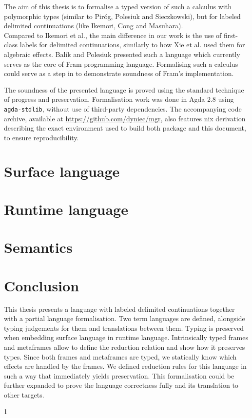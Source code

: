 \documentclass[shortabstract,english,mgr]{iithesis}
\begin{document}
\pagebreak
The aim of this thesis is to formalise a typed version of such a calculus with polymorphic types (similar to Piróg, Polesiuk and Sieczkowski\cite{typed_equivalence}), but for labeled delimited continuations (like Ikemori, Cong and  Masuhara\cite{typed_equivalence_label}).
\\
Compared to Ikemori et al., the main difference in our work is the use of first-class labels for delimited continuations, similarly to how Xie et al.\cite{first_class_names} used them for algebraic effects.
Balik and Polesiuk  presented such a language\cite{unpublished} which currently serves as the core of Fram programming language.
Formalising such a calculus could serve as a step in to demonstrate soundness of Fram's implementation.


The soundness of the presented language is proved using the standard technique of progress and preservation\cite{syntactic}\cite{harper}.
Formalisation work was done in Agda 2.8\cite{agda} using \texttt{agda-stdlib}\cite{agda-stdlib}, without use of third-party dependencies. The accompanying code archive, available at \href{https://github.com/dyniec/mgr}{https://github.com/dyniec/mgr}, also features nix derivation describing the exact environment used to build both package and this document, to ensure reproducibility.


\chapter{Surface language}

\chapter{Runtime language}

\chapter{Semantics}

\chapter{Conclusion}
This thesis presents a language with labeled delimited continuations together with a partial language formalisation. Two term languages are defined, alongside typing judgements for them and translations between them. Typing is preserved when embedding surface language in runtime language. Intrinsically typed frames and metaframes allow to define the reduction relation and show how it preserves types. Since both frames and metaframes are typed, we statically know which effects are handled by the frames. We defined reduction rules for this language in such a way that immediately yields preservation. This formalisation could be further expanded to prove the language correctness fully and its translation to other targets. 
\begin{thebibliography}{1}

\end{thebibliography}
\end{document}
